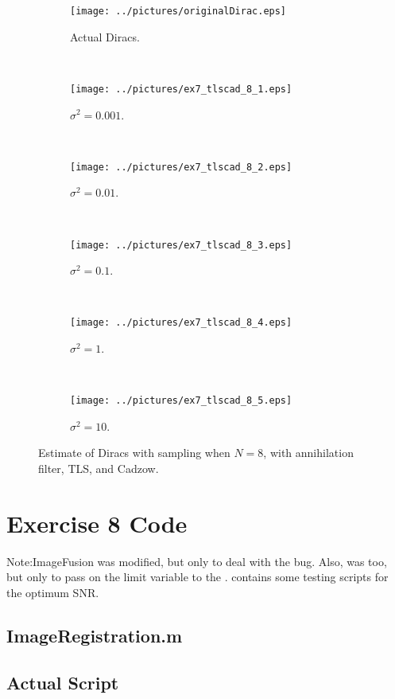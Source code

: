 \documentclass[11pt,a4paper]{report}
\begin{document}
\begin{figure}[H]
    \captionsetup[subfigure]{position=b}
    \centering
    \begin{subfigure}{0.49\textwidth}
        \texttt{[image: ../pictures/originalDirac.eps]}
        \caption{Actual Diracs.}
        \label{fig:ex7_tlscad_8_0}
    \end{subfigure}
    ~
    \begin{subfigure}{0.49\textwidth}
        \texttt{[image: ../pictures/ex7\_tlscad\_8\_1.eps]}
        \caption{$\sigma^2 = 0.001$.}
        \label{fig:ex7_tlscad_8_1}
    \end{subfigure}
    \\
    \begin{subfigure}{0.49\textwidth}
        \texttt{[image: ../pictures/ex7\_tlscad\_8\_2.eps]}
        \caption{$\sigma^2 = 0.01$.}
        \label{fig:ex7_tlscad_8_2}
    \end{subfigure}
    ~
    \begin{subfigure}{0.49\textwidth}
        \texttt{[image: ../pictures/ex7\_tlscad\_8\_3.eps]}
        \caption{$\sigma^2 = 0.1$.}
        \label{fig:ex7_tlscad_8_3}
    \end{subfigure}
    \\
    \begin{subfigure}{0.49\textwidth}
        \texttt{[image: ../pictures/ex7\_tlscad\_8\_4.eps]}
        \caption{$\sigma^2 = 1$.}
        \label{fig:ex7_tlscad_8_4}
    \end{subfigure}
    ~
    \begin{subfigure}{0.49\textwidth}
        \texttt{[image: ../pictures/ex7\_tlscad\_8\_5.eps]}
        \caption{$\sigma^2 = 10$.}
        \label{fig:ex7_tlscad_8_5}
    \end{subfigure}

    \caption{Estimate of Diracs with sampling when $N = 8$, with annihilation filter, TLS, and Cadzow.}
    \label{fig:ex7_tlscad_8}
\end{figure}

\newpage

\section{Exercise 8 Code}
Note:ImageFusion was modified, but only to deal with the  bug. Also,  was too, but only to pass on the limit variable to the .  contains some testing scripts for the optimum SNR.

\subsection{ImageRegistration.m}

\newpage

\subsection{Actual Script}

\end{document}
